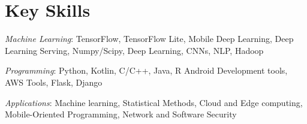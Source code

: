 \section*{Key Skills}
\emph{Machine Learning}:
	TensorFlow,
	TensorFlow Lite,
	Mobile Deep Learning,
	Deep Learning Serving,
	Numpy/Scipy,
	Deep Learning,
	CNNs, NLP,
	Hadoop

\emph{Programming}: 
	Python, Kotlin, C/C++, Java, R
	Android Development tools,
	AWS Tools,
	Flask, Django
	
\emph{Applications}:
	Machine learning, Statistical Methods,
	Cloud and Edge computing,
	Mobile-Oriented Programming,
	Network and Software Security

